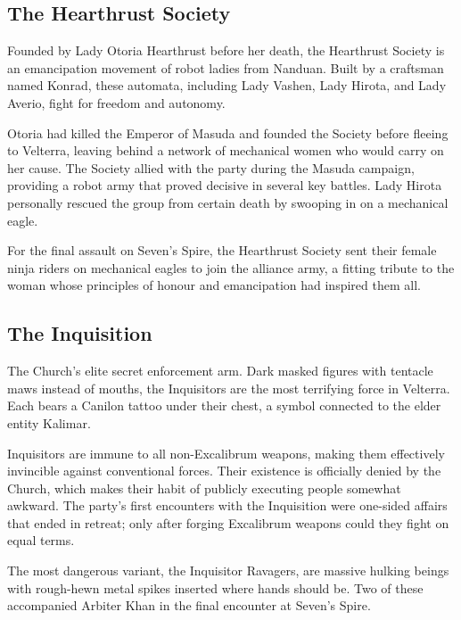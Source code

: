 \subsection*{The Hearthrust Society}

Founded by Lady Otoria Hearthrust before her death, the Hearthrust Society is an emancipation movement of robot ladies from Nanduan.  Built by a craftsman named Konrad, these automata, including Lady Vashen, Lady Hirota, and Lady Averio, fight for freedom and autonomy.

Otoria had killed the Emperor of Masuda and founded the Society before fleeing to Velterra, leaving behind a network of mechanical women who would carry on her cause.  The Society allied with the party during the Masuda campaign, providing a robot army that proved decisive in several key battles.  Lady Hirota personally rescued the group from certain death by swooping in on a mechanical eagle.

For the final assault on Seven's Spire, the Hearthrust Society sent their female ninja riders on mechanical eagles to join the alliance army, a fitting tribute to the woman whose principles of honour and emancipation had inspired them all.

\smallskip

\subsection*{The Inquisition}

The Church's elite secret enforcement arm.  Dark masked figures with tentacle maws instead of mouths, the Inquisitors are the most terrifying force in Velterra.  Each bears a Canilon tattoo under their chest, a symbol connected to the elder entity Kalimar.

Inquisitors are immune to all non-Excalibrum weapons, making them effectively invincible against conventional forces.  Their existence is officially denied by the Church, which makes their habit of publicly executing people somewhat awkward.  The party's first encounters with the Inquisition were one-sided affairs that ended in retreat; only after forging Excalibrum weapons could they fight on equal terms.

The most dangerous variant, the Inquisitor Ravagers, are massive hulking beings with rough-hewn metal spikes inserted where hands should be.  Two of these accompanied Arbiter Khan in the final encounter at Seven's Spire.

\smallskip

